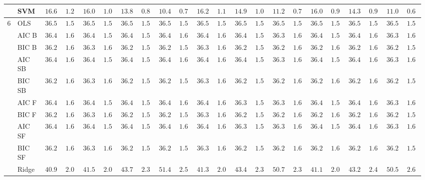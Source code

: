 \begin{tabular}{p{0.2cm}p{1cm}|p{0.6cm}p{0.6cm}|p{0.6cm}p{0.6cm}p{0.6cm}p{0.6cm}p{0.6cm}p{0.6cm}|p{0.6cm}p{0.6cm}p{0.6cm}p{0.6cm}p{0.6cm}p{0.6cm}|p{0.6cm}p{0.6cm}p{0.6cm}p{0.6cm}p{0.6cm}p{0.6cm}}
 & SVM  & $16.69$ & $1.28$ & $16.02$ & $1.07$ & $13.84$ & $0.88$ & $10.42$ & $0.75$ & $16.22$ & $1.11$ & $14.93$ & $1.04$ & $11.24$ & $0.76$ & $16.04$ & $0.95$ & $14.39$ & $0.91$ & $11.08$ & $0.67$ \\\hline
6 & OLS  & $36.50$ & $1.59$ & $36.50$ & $1.59$ & $36.50$ & $1.59$ & $36.50$ & $1.59$ & $36.50$ & $1.59$ & $36.50$ & $1.59$ & $36.50$ & $1.59$ & $36.50$ & $1.59$ & $36.50$ & $1.59$ & $36.50$ & $1.59$ \\
 & AIC B  & $36.41$ & $1.60$ & $36.40$ & $1.59$ & $36.40$ & $1.57$ & $36.41$ & $1.60$ & $36.40$ & $1.60$ & $36.41$ & $1.57$ & $36.39$ & $1.62$ & $36.41$ & $1.58$ & $36.41$ & $1.61$ & $36.39$ & $1.60$ \\
 & BIC B  & $36.28$ & $1.60$ & $36.30$ & $1.60$ & $36.28$ & $1.59$ & $36.26$ & $1.58$ & $36.30$ & $1.60$ & $36.29$ & $1.59$ & $36.29$ & $1.61$ & $36.29$ & $1.60$ & $36.28$ & $1.60$ & $36.28$ & $1.59$ \\
 & AIC SB  & $36.41$ & $1.60$ & $36.40$ & $1.59$ & $36.40$ & $1.57$ & $36.41$ & $1.60$ & $36.40$ & $1.60$ & $36.41$ & $1.57$ & $36.39$ & $1.62$ & $36.41$ & $1.58$ & $36.41$ & $1.61$ & $36.39$ & $1.60$ \\
 & BIC SB  & $36.28$ & $1.60$ & $36.30$ & $1.60$ & $36.28$ & $1.59$ & $36.26$ & $1.58$ & $36.30$ & $1.60$ & $36.29$ & $1.59$ & $36.29$ & $1.61$ & $36.29$ & $1.60$ & $36.28$ & $1.60$ & $36.28$ & $1.59$ \\
 & AIC F  & $36.41$ & $1.60$ & $36.40$ & $1.59$ & $36.40$ & $1.58$ & $36.41$ & $1.60$ & $36.40$ & $1.60$ & $36.39$ & $1.58$ & $36.37$ & $1.60$ & $36.41$ & $1.58$ & $36.40$ & $1.61$ & $36.39$ & $1.61$ \\
 & BIC F  & $36.28$ & $1.60$ & $36.30$ & $1.60$ & $36.27$ & $1.59$ & $36.26$ & $1.58$ & $36.30$ & $1.60$ & $36.29$ & $1.59$ & $36.28$ & $1.62$ & $36.29$ & $1.60$ & $36.28$ & $1.60$ & $36.28$ & $1.59$ \\
 & AIC SF  & $36.41$ & $1.60$ & $36.40$ & $1.59$ & $36.40$ & $1.58$ & $36.41$ & $1.60$ & $36.40$ & $1.60$ & $36.39$ & $1.58$ & $36.37$ & $1.60$ & $36.41$ & $1.58$ & $36.40$ & $1.61$ & $36.39$ & $1.61$ \\
 & BIC SF  & $36.28$ & $1.60$ & $36.30$ & $1.60$ & $36.27$ & $1.59$ & $36.26$ & $1.58$ & $36.30$ & $1.60$ & $36.29$ & $1.59$ & $36.28$ & $1.62$ & $36.29$ & $1.60$ & $36.28$ & $1.60$ & $36.28$ & $1.59$ \\
 & Ridge  & $40.95$ & $2.01$ & $41.53$ & $2.02$ & $43.71$ & $2.31$ & $51.41$ & $2.54$ & $41.35$ & $2.08$ & $43.42$ & $2.32$ & $50.71$ & $2.31$ & $41.16$ & $2.09$ & $43.29$ & $2.44$ & $50.53$ & $2.65$ \\

\end{tabular}
